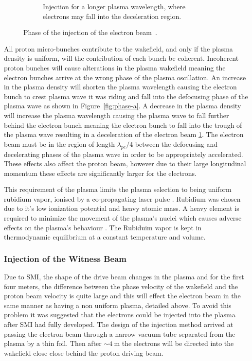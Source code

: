\begin{figure}[!tb]
\begin{subfigure}{\linewidth}
		\caption{Injection for a longer plasma wavelength, where electrons may
		fall into the deceleration region.}
		\label{fig:phase-c}
	\end{subfigure}
	\caption{
		Phase of the injection of the electron
		beam~\cite{wiedemann2007particle}.
	}
	\label{fig:phases}
\end{figure}


All proton micro-bunches contribute to the wakefield, and only if the plasma
density is uniform, will the contribution of each bunch be coherent. Incoherent
proton bunches
will cause alterations in the plasma wakefield meaning the electron bunches
arrive at the wrong phase of the plasma
oscillation. An increase in the plasma density will shorten the plasma
wavelength causing the electron bunch to crest plasma wave it was riding and
fall into the defocusing phase of the plasma wave as shown in
Figure~\ref{fig:phase-a}. A decrease in the plasma density will increase the
plasma wavelength causing the plasma wave to fall further behind the electron
bunch meaning the electron bunch to fall into the trough of the plasma wave
resulting in a deceleration of the electron beam \ref{fig:phase-c}. The electron
beam must be in the region of length \(\lambda_{pe}/4\) between the defocusing
and decelerating phases of the plasma wave in order to be appropriately
accelerated. These effects also affect the proton beam, however due to their
large longitudinal momentum these effects are significantly larger for the
electrons.

This requirement of the plasma limits the plasma selection to being uniform
rubidium vapor, ionised by a co-propagating laser pulse \cite{oz2014novel,
oz2014bja}. Rubidium was chosen due to it's low ionization potential and heavy
atomic mass. A heavy element is required to minimize the movement of the
plasma's nuclei which causes adverse effects on the plasma's behaviour
\cite{vieira2012nj,vieira2014bqa}. The Rubiduim vapor is kept in thermodynamic
equilibrium at a constant temperature and volume.


\subsubsection{Injection of the Witness Beam}

Due to SMI, the shape of the drive beam changes in the plasma and for the first
four meters, the difference between the phase velocity of the wakefield and the
proton beam velocity is quite large and this will effect the electron beam in
the same manner as having a non uniform plasma, detailed above. To avoid this
problem it was suggested that the electrons could be injected into the plasma
after SMI had fully developed. The design of the injection method arrived at
passing the electron beam through a narrow vacuum tube separated from the
plasma by a thin foil. Then after \(\sim \SI{4}{\meter}\) the electrons will be
directed into the wakefield close close behind the proton driving beam.

